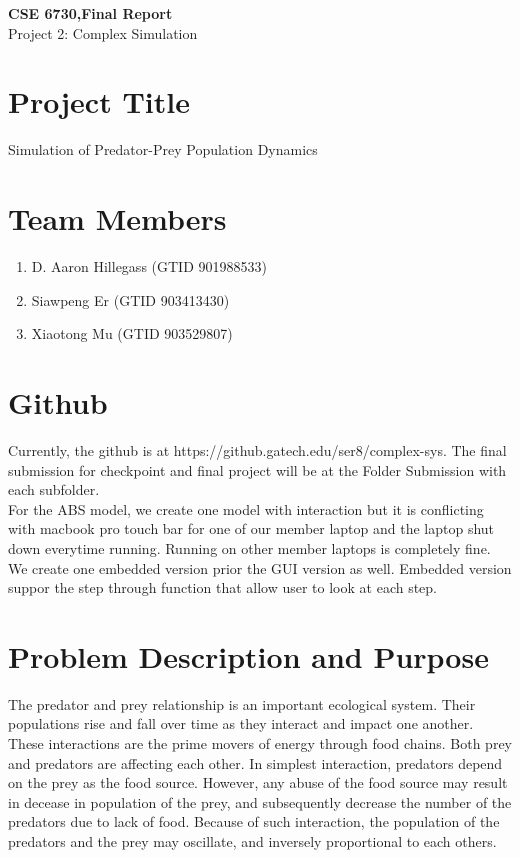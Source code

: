 \documentclass{article}
\begin{document}
	\begin{center}
		
		\LARGE{\textbf{CSE 6730,Final Report}} \\
		\vspace{1em}
		\Large{Project 2: Complex Simulation} \\
		
	\end{center}
	\begin{normalsize}
		
		\section{Project Title}
		
		Simulation of Predator-Prey Population Dynamics 
		
		\section{Team Members}
		
		\begin{enumerate}
			\item D. Aaron Hillegass (GTID 901988533)
			\item Siawpeng Er (GTID 903413430)
			\item Xiaotong Mu (GTID 903529807)
		\end{enumerate}
	
		\section{Github}
		Currently, the github is at https://github.gatech.edu/ser8/complex-sys.
		The final submission for checkpoint and final project will be at the Folder Submission with each subfolder.\\
		For the ABS model, we create one model with interaction but it is conflicting with macbook pro touch bar for one of our member laptop and the laptop shut down everytime running. Running on other member laptops is completely fine. \\
		We create one embedded version prior the GUI version as well. Embedded version suppor the step through function that allow user to look at each step.
		
		\section{Problem Description and Purpose}
		The predator and prey relationship is an important ecological system. Their populations rise and fall over time as they interact and impact one another. These interactions are the prime movers of energy through food chains. Both prey and predators are affecting each other. \cite{laham_2012_a}In simplest interaction, predators depend on the prey as the food source. However, any abuse of the food source may result in decease in population of the prey, and subsequently decrease the number of the predators due to lack of food. Because of such interaction, the population of the predators and the prey may oscillate, and inversely proportional to each others.\cite{obaid_2013_the}\
		

\end{normalsize}
\end{document}
